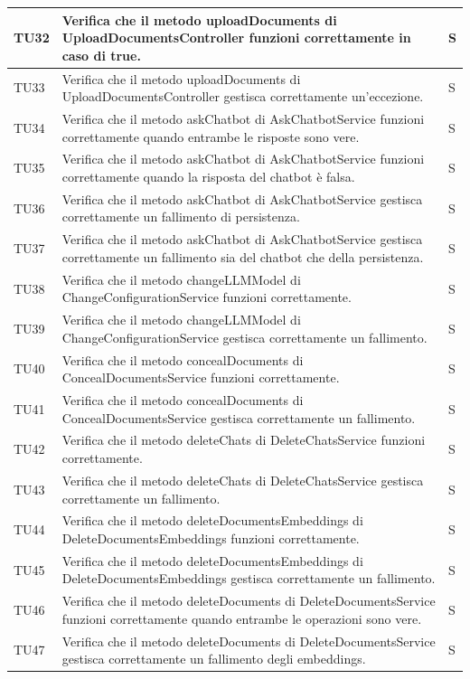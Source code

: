 \documentclass[10pt, a4paper]{article}
\begin{document}
\begin{xltabular}{\textwidth}{p{0.12\textwidth}|p{0.7\textwidth}|X}
\hline
TU32 & Verifica che il metodo uploadDocuments di UploadDocumentsController funzioni correttamente in caso di true. & S \\
\hline
TU33 & Verifica che il metodo uploadDocuments di UploadDocumentsController gestisca correttamente un'eccezione. & S \\
\hline
TU34 & Verifica che il metodo askChatbot di AskChatbotService funzioni correttamente quando entrambe le risposte sono vere. & S \\
\hline
TU35 & Verifica che il metodo askChatbot di AskChatbotService funzioni correttamente quando la risposta del chatbot è falsa. & S \\
\hline
TU36 & Verifica che il metodo askChatbot di AskChatbotService gestisca correttamente un fallimento di persistenza. & S \\
\hline
TU37 & Verifica che il metodo askChatbot di AskChatbotService gestisca correttamente un fallimento sia del chatbot che della persistenza. & S \\
\hline
TU38 & Verifica che il metodo changeLLMModel di ChangeConfigurationService funzioni correttamente. & S \\
\hline
TU39 & Verifica che il metodo changeLLMModel di ChangeConfigurationService gestisca correttamente un fallimento. & S \\
\hline
TU40 & Verifica che il metodo concealDocuments di ConcealDocumentsService funzioni correttamente. & S \\
\hline
TU41 & Verifica che il metodo concealDocuments di ConcealDocumentsService gestisca correttamente un fallimento. & S \\
\hline
TU42 & Verifica che il metodo deleteChats di DeleteChatsService funzioni correttamente. & S \\
\hline
TU43 & Verifica che il metodo deleteChats di DeleteChatsService gestisca correttamente un fallimento. & S \\
\hline
TU44 & Verifica che il metodo deleteDocumentsEmbeddings di DeleteDocumentsEmbeddings funzioni correttamente. & S \\
\hline
TU45 & Verifica che il metodo deleteDocumentsEmbeddings di DeleteDocumentsEmbeddings gestisca correttamente un fallimento. & S \\
\hline
TU46 & Verifica che il metodo deleteDocuments di DeleteDocumentsService funzioni correttamente quando entrambe le operazioni sono vere. & S \\
\hline
TU47 & Verifica che il metodo deleteDocuments di DeleteDocumentsService gestisca correttamente un fallimento degli embeddings. & S \\

\end{xltabular}
\end{document}
